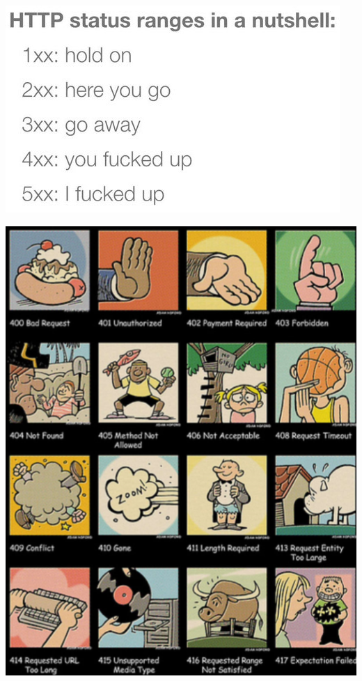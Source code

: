 \documentclass[a4paper, 11pt]{article}
\begin{document}
\begin{minipage}{0.5\textwidth}
	\includegraphics[keepaspectratio=true, height=10\baselineskip]{http_codes.jpg}
\end{minipage} \hfil
\begin{minipage}{0.5\textwidth}
	\includegraphics[keepaspectratio=true, height=17\baselineskip]{http_codes_2.png}
\end{minipage}
\end{document}
